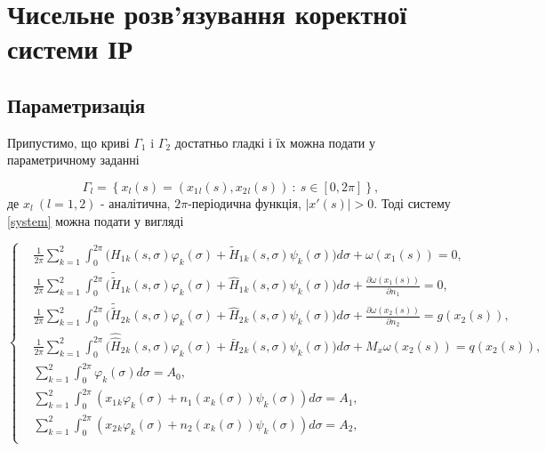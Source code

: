 \documentclass[12pt]{report}
\begin{document}
\chapter{Чисельне розв'язування коректної системи ІР}

\section{Параметризація}


Припустимо, що криві $\Gamma_1$ i $\Gamma_2$ достатньо гладкі і їх можна подати у параметричному заданні 
 
 \begin{equation}
 	\Gamma_l=\left\{x_l(s)=(x_1{_l}(s),x_2{_l}(s)) \ : \ s\in [0,2\pi]\right\},
  \end{equation}
 де $x_l \ (l=1,2)$ - аналітична, $2\pi$-періодична функція, $|x'(s)|>0.$
 Тоді систему \eqref{system} можна подати у вигляді
 
 \begin{equation}
 		\left\{
	 	\begin{split}
		\label{paramSystem}
	 		&\frac{1}{2\pi}\sum_{k=1}^{2}\int_{0}^{2\pi}\bigg(H_1{_k}(s, \sigma)\varphi_k(\sigma)+\tilde{H}_1{_k}(s, \sigma)\psi_k(\sigma)\bigg)d\sigma+\omega(x_1(s))=0,\\
			&\frac{1}{2\pi}\sum_{k=1}^{2}\int_{0}^{2\pi}\bigg(\tilde{\tilde{H}}_1{_k}(s, \sigma)\varphi_k(\sigma)+\hat{H}_1{_k}(s, \sigma)\psi_k(\sigma)\bigg)d\sigma+\frac{\partial\omega(x_1(s))}{\partial n_1}=0, \\
			&\frac{1}{2\pi}\sum_{k=1}^{2}\int_{0}^{2\pi}\bigg(\tilde{\tilde{H}}_2{_k}(s, \sigma)\varphi_k(\sigma)+\hat{H}_2{_k}(s, \sigma)\psi_k(\sigma)\bigg)d\sigma+\frac{\partial\omega(x_2(s))}{\partial n_2}=g(x_2(s)), \\
			&\frac{1}{2\pi}\sum_{k=1}^{2}\int_{0}^{2\pi}\bigg(\hat{\hat{H}}_2{_k}(s, \sigma)\varphi_k(\sigma)+\bar{H}_2{_k}(s, \sigma)\psi_k(\sigma)\bigg)d\sigma+M_x\omega(x_2(s))=q(x_2(s)),\\
			&\sum_{k=1}^{2}\int_{0}^{2\pi}\varphi_k(\sigma)d\sigma=A_0, \\
			&\sum_{k=1}^{2}\int_{0}^{2\pi}(x_1{_k}\varphi_k(\sigma)+n_1(x_k(\sigma))\psi_k(\sigma))d\sigma=A_1, \\
			&\sum_{k=1}^{2}\int_{0}^{2\pi}(x_2{_k}\varphi_k(\sigma)+n_2(x_k(\sigma))\psi_k(\sigma))d\sigma=A_2, \\
		\end{split}
		\right.
\end{equation}
\end{document}
